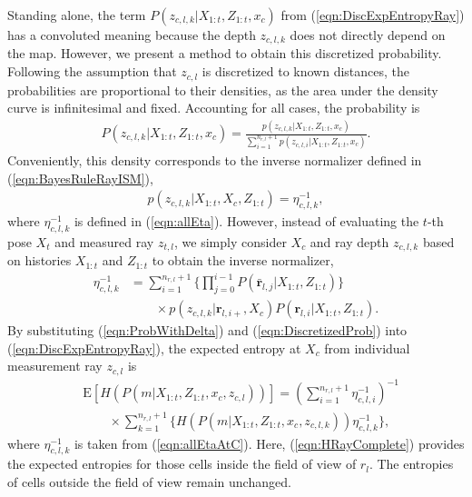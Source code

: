 \documentclass[letterpaper, 10pt, conference]{ieeeconf}
\newcommand{\refeqn}[1]{(\ref{eqn:#1})}
\begin{document}
Standing alone, the term $P(z_{c,l,k}|X_{1:t},Z_{1:t},x_c)$ from \refeqn{DiscExpEntropyRay} has a convoluted meaning because the depth $z_{c,l,k}$ does not directly depend on the map. However, we present a method to obtain this discretized probability. %
Following the assumption that $z_{c,l}$ is discretized to known distances, the probabilities are proportional to their densities, as the area under the density curve is infinitesimal and fixed. Accounting for all cases, the probability is
\begin{align}
\label{eqn:ProbWithDelta}
P(z_{c,l,k}|X_{1:t},Z_{1:t},x_c)=\frac{p(z_{c,l,k}|X_{1:t},Z_{1:t},x_c)}{\sum_{i=1}^{n_{r,l}+1}p(z_{c,l,i}|X_{1:t},Z_{1:t},x_c)}.
\end{align}
Conveniently, this density corresponds to the inverse normalizer defined in \refeqn{BayesRuleRayISM},
\begin{align}
\label{eqn:DiscretizedProb}
p(z_{c,l,k}|X_{1:t},X_c,Z_{1:t})=\eta_{c,l,k}^{-1},
\end{align}
where $\eta_{c,l,k}^{-1}$ is defined in \refeqn{allEta}. However, instead of evaluating the $t$-th pose $X_t$ and measured ray $z_{t,l}$, we simply consider $X_c$ and ray depth $z_{c,l,k}$ based on histories $X_{1:t}$ and $Z_{1:t}$ to obtain the inverse normalizer,
\begin{align}
\label{eqn:allEtaAtC}
\eta_{c,l,k}^{-1}
&=
\sum_{i=1}^{n_{r,l}+1}\bigg\{\prod_{j=0}^{i-1}P(\bar{\mathbf{r}}_{l,j}|X_{1:t},Z_{1:t})\bigg\}\nonumber\\&\qquad\times p(z_{c,l,k}|\mathbf{r}_{l,i+},X_c)P(\mathbf{r}_{l,i}|X_{1:t},Z_{1:t}).
\end{align}
By substituting \refeqn{ProbWithDelta} and \refeqn{DiscretizedProb} into \refeqn{DiscExpEntropyRay}, the expected entropy at $X_c$ from individual measurement ray $z_{c,l}$ is
\begin{align}
\label{eqn:HRayComplete}
&\text{E}[H(P(m|X_{1:t},Z_{1:t},x_c,z_{c,l}))]=\left(\sum_{i=1}^{n_{r,l}+1}\eta_{c,l,i}^{-1}\right)^{-1}\nonumber\\&\quad\quad\times\sum_{k=1}^{n_{r,l}+1}\bigg\{H(P(m|X_{1:t},Z_{1:t},x_c,z_{c,l,k}))\eta_{c,l,k}^{-1}\bigg\},
\end{align}
where $\eta_{c,l,k}^{-1}$ is taken from \refeqn{allEtaAtC}.
Here, \refeqn{HRayComplete} provides the expected entropies for those cells inside the field of view of $r_l$. %
The entropies of cells outside the field of view remain unchanged.
\end{document}
